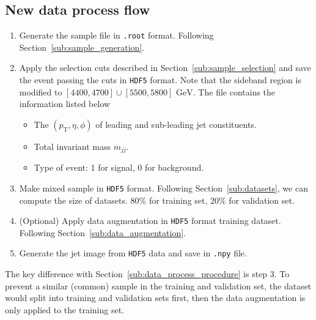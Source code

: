 \documentclass[12pt]{article}
\begin{document}
    \subsection{New data process flow}%
    \label{sub:new_data_process_flow}
        \begin{enumerate}
            \item Generate the sample file in \verb|.root| format. Following Section~\ref{sub:sample_generation}.
            \item Apply the selection cuts described in Section~\ref{sub:sample_selection} and save the event passing the cuts in \verb|HDF5| format. Note that the sideband region is modified to $[4400,4700] \cup [5500,5800] \text{ GeV}$. The file contains the information listed below
                \begin{itemize}
                    \item The $\left( p_{\text{T}}, \eta, \phi \right) $ of leading and sub-leading jet constituents.
                    \item Total invariant mass $m_{jj}$.
                    \item Type of event: 1 for signal, 0 for background.
                \end{itemize}
            \item Make mixed sample in \verb|HDF5| format. Following Section~\ref{sub:datasets}, we can compute the size of datasets. 80\% for training set, 20\% for validation set.
            \item (Optional) Apply data augmentation in \verb|HDF5| format training dataset. Following Section~\ref{sub:data_augmentation}.
            \item Generate the jet image from \verb|HDF5| data and save in \verb|.npy| file.
        \end{enumerate}
        The key difference with Section~\ref{sub:data_process_procedure} is step 3. To prevent a similar (common) sample in the training and validation set, the dataset would split into training and validation sets first, then the data augmentation is only applied to the training set.
\end{document}
